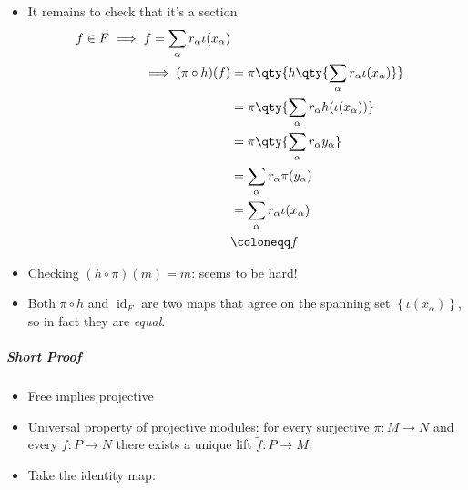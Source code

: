 \begin{solution}
\begin{itemize}
  \begin{center}
  \end{center}
\item
  It remains to check that it's a section:
  \begin{align*}
  f\in F \implies f = \sum_\alpha r_\alpha { \iota(x_\alpha) } \\
  \implies (\pi \circ h)(f) 
  &= \pi \qty{h\qty{\sum_\alpha r_\alpha \iota(x_\alpha) }}  \\
  &= \pi\qty{\sum_\alpha r_\alpha h(\iota(x_\alpha))} \\
  &= \pi\qty{ \sum_\alpha r_\alpha y_\alpha} \\
  &= \sum_\alpha r_\alpha \pi(y_\alpha) \\
  &= \sum_\alpha r_\alpha \iota(x_\alpha) \\
  &\coloneqq f
  \end{align*}
\item
  Checking \((h\circ \pi)(m) = m\): seems to be hard!
\item
  Both \(\pi\circ h\) and \(\operatorname{id}_F\) are two maps that
  agree on the spanning set \(\left\{{\iota(x_\alpha)}\right\}\), so in
  fact they are \emph{equal}.
\end{itemize}

\hypertarget{short-proof}{%
\subparagraph{Short Proof}\label{short-proof}}

\begin{itemize}
\item
  Free implies projective
\item
  Universal property of projective modules: for every surjective
  \(\pi:M\to N\) and every \(f:P\to N\) there exists a unique lift
  \(\tilde f: P\to M\):

  \begin{center}
  \end{center}
\item
  Take the identity map:


\end{itemize}
\end{solution}
